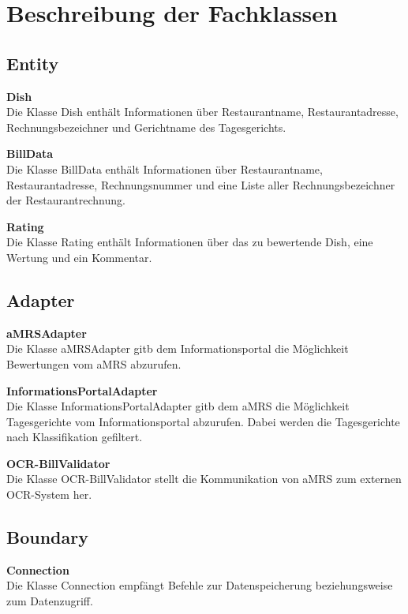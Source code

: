 \section*{Beschreibung der Fachklassen}

\subsection*{Entity}
\textbf{Dish} \\
Die Klasse Dish enthält Informationen über Restaurantname, Restaurantadresse, Rechnungsbezeichner und Gerichtname des
Tagesgerichts.
\newline

\noindent \textbf{BillData} \\
Die Klasse BillData enthält Informationen über Restaurantname, Restaurantadresse, Rechnungsnummer und eine Liste aller
Rechnungsbezeichner der Restaurantrechnung.
\newline

\noindent \textbf{Rating} \\
Die Klasse Rating enthält Informationen über das zu bewertende Dish, eine Wertung und ein Kommentar.

\subsection*{Adapter}
\noindent \textbf{aMRSAdapter}\\
Die Klasse aMRSAdapter gitb dem Informationsportal die Möglichkeit Bewertungen vom \ac{aMRS} abzurufen.
\newline

\noindent \textbf{InformationsPortalAdapter}\\
Die Klasse InformationsPortalAdapter gitb dem \ac{aMRS} die Möglichkeit Tagesgerichte vom Informationsportal abzurufen.
Dabei werden die Tagesgerichte nach Klassifikation gefiltert.
\newline

\noindent \textbf{OCR-BillValidator}\\
Die Klasse OCR-BillValidator stellt die Kommunikation von \ac{aMRS} zum externen OCR-System her.


\subsection*{Boundary}
\noindent \textbf{Connection}\\
Die Klasse Connection empfängt Befehle zur Datenspeicherung beziehungsweise zum Datenzugriff.

